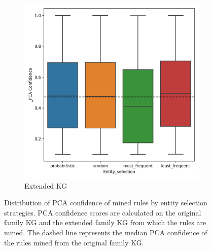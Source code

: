 \begin{figure}[h]
\begin{subfigure}{.5\textwidth}
  \includegraphics[width=1\linewidth]{figures/results/entity_selection/_PCA-entity_family.png}
  \caption{Extended KG}
  \label{fig:_PCA_entity_family_boxplot_sub}
\end{subfigure}
\caption{Distribution of PCA confidence of mined rules by entity selection strategies. PCA confidence scores are calculated on the original family KG and the extended family KG from which the rules are mined. The dashed line represents the median PCA confidence of the rules mined from the original family KG.}
\label{fig:PCA_entity_family_boxplot}
\end{figure}



